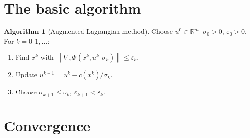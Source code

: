 \documentclass[11pt,a4paper]{report}
\theoremstyle{plain}
\theoremstyle{definition}
\newtheorem{algorithm}[theorem]{Algorithm}
\newcommand{\R}{\mathbb{R}}
\newcommand{\norm}[1]{\left\lVert#1\right\rVert}
\newcommand{\grad}{\nabla}
\newcommand{\eps}{\varepsilon}
\begin{document}
\section{The basic algorithm}

\begin{algorithm}[Augmented Lagrangian method]\label{alg:auglag}
Choose $u^{0}\in\R^{m}$, $\sigma_{0}>0$, $\eps_{0}>0$. For $k=0,1,\dots$:
\begin{enumerate}[leftmargin=2em,itemsep=0pt]
  \item Find $x^{k}$ with $\norm{\grad_{x}\Phi(x^{k},u^{k},\sigma_{k})}\le\eps_{k}$.
  \item Update $u^{k+1}=u^{k}-c(x^{k})/\sigma_{k}$.
  \item Choose $\sigma_{k+1}\le\sigma_{k}$, $\eps_{k+1}<\eps_{k}$.
\end{enumerate}
\end{algorithm}

\section{Convergence}
\end{document}
